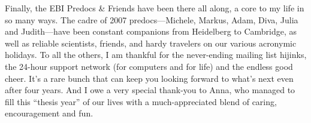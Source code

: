 \begin{acknowledgements}
Finally, the EBI Predocs \& Friends have been there all along, a core
to my life in so many ways. The cadre of 2007 predocs---Michele,
Markus, Adam, Diva, Julia and Judith---have been constant companions
from Heidelberg to Cambridge, as well as reliable scientists, friends,
and hardy travelers on our various acronymic holidays. To all the
others, I am thankful for the never-ending mailing list hijinks, the
24-hour support network (for computers and for life) and the endless
good cheer. It's a rare bunch that can keep you looking forward to
what's next even after four years. And I owe a very special thank-you
to Anna, who managed to fill this ``thesis year'' of our lives with a
much-appreciated blend of caring, encouragement and fun.

\end{acknowledgements}
